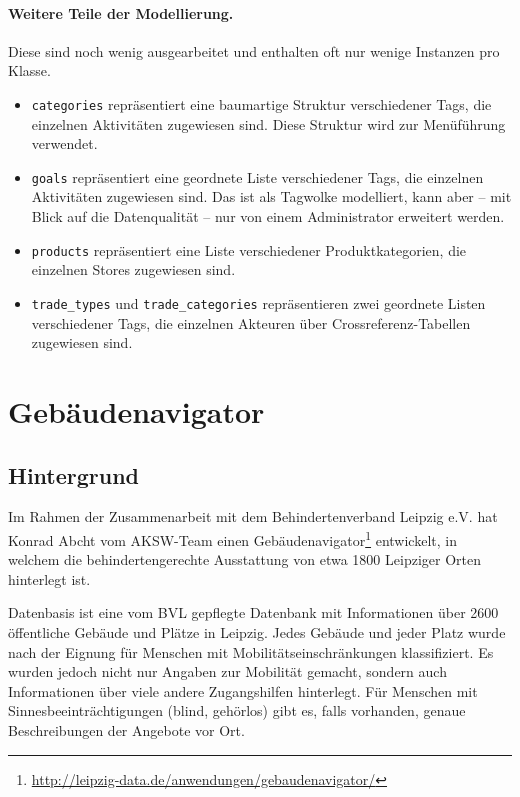\documentclass[a4paper,11pt]{article}
\begin{document}
\paragraph{Weitere Teile der Modellierung.}
Diese sind noch wenig ausgearbeitet und enthalten oft nur wenige Instanzen pro
Klasse. 
\begin{itemize}\itemsep0pt
\item \texttt{categories} repräsentiert eine baumartige Struktur verschiedener
  Tags, die einzelnen Aktivitäten zugewiesen sind.  Diese Struktur wird zur
  Menüführung verwendet. 
\item \texttt{goals} repräsentiert eine geordnete Liste verschiedener Tags, die
  einzelnen Aktivitäten zugewiesen sind. Das ist als Tagwolke modelliert, kann
  aber -- mit Blick auf die Datenqualität -- nur von einem Administrator
  erweitert werden.
\item \texttt{products} repräsentiert eine Liste verschiedener
  Produktkategorien, die einzelnen Stores zugewiesen sind.
\item \texttt{trade\_types} und \texttt{trade\_categories} repräsentieren zwei
  geordnete Listen verschiedener Tags, die einzelnen Akteuren über 
  Crossreferenz-Tabellen zugewiesen sind.
\end{itemize}
\newpage

\section{Gebäudenavigator}

\subsection{Hintergrund}
Im Rahmen der Zusammenarbeit mit dem Behindertenverband Leipzig e.V. hat Konrad
Abcht vom AKSW-Team einen
Gebäudenavigator\footnote{\url{http://leipzig-data.de/anwendungen/gebaudenavigator/}}
entwickelt, in welchem die behindertengerechte Ausstattung von etwa 1800
Leipziger Orten hinterlegt ist.

Datenbasis ist eine vom BVL gepflegte Datenbank mit Informationen über 2600
öffentliche Gebäude und Plätze in Leipzig. Jedes Gebäude und jeder Platz wurde
nach der Eignung für Menschen mit Mobilitätseinschränkungen klassifiziert. Es
wurden jedoch nicht nur Angaben zur Mobilität gemacht, sondern auch
Informationen über viele andere Zugangshilfen hinterlegt. Für Menschen mit
Sinnesbeeinträchtigungen (blind, gehörlos) gibt es, falls vorhanden, genaue
Beschreibungen der Angebote vor Ort.
\end{document}
